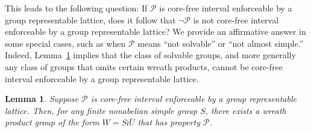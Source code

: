 \documentclass{gen-j-l}
\newcommand{\<}{\ensuremath{\langle}}
\renewcommand{\>}{\ensuremath{\rangle}}
\theoremstyle{plain}
\newtheorem{lemma}[theorem]{Lemma}
\theoremstyle{definition}
\theoremstyle{remark}
\numberwithin{theorem}{section}
\numberwithin{claim}{section}
\numberwithin{equation}{section}
\numberwithin{conjecture}{section}
\newcommand{\2}{\ensuremath{\mathbf{2}}}
\newcommand{\3}{\ensuremath{\mathbf{3}}}
\newcommand{\cP}{\ensuremath{\mathcal{P}}}
\begin{document}
This leads to the following question:
If $\cP$ is core-free interval enforceable by a group representable lattice,
does it follow that $\neg \cP$ is not core-free interval enforceable by a group
representable lattice?
We provide an affirmative answer in some special cases, such as when $\cP$ means
``not solvable'' or ``not almost simple.''
Indeed, Lemma~\ref{lem:IE-must-have-wreaths} implies that the class of
solvable groups, and more generally any class of groups that omits certain wreath
products, cannot be core-free interval enforceable by a group representable
lattice. 

\begin{lemma}
\label{lem:IE-must-have-wreaths}
Suppose $\cP$ is core-free interval enforceable by a group
representable lattice. Then, for any finite nonabelian simple group $S$, there
exists a wreath product group of the form $W = S\wr \bar{U}$ that has property
$\cP$. 
\end{lemma}
\end{document}
